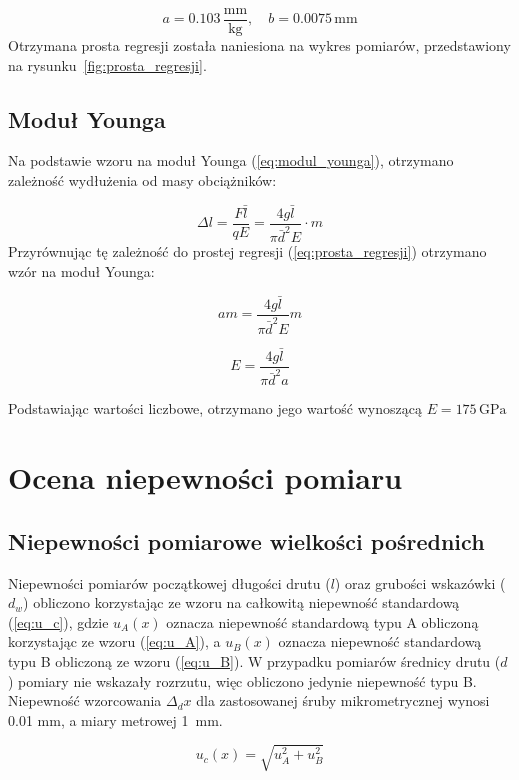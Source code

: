 \documentclass[a4paper,12pt]{article}
\begin{document}
\begin{equation}
a = 0.103\,\frac{\text{mm}}{\text{kg}}, \quad 
b = 0.0075\,\text{mm}
\end{equation}
Otrzymana prosta regresji została naniesiona na wykres pomiarów, przedstawiony na rysunku~\ref{fig:prosta_regresji}.

\subsection{Moduł Younga}

Na podstawie wzoru na moduł Younga (\ref{eq:modul_younga}), otrzymano zależność wydłużenia od masy obciążników:

\begin{equation}
\Delta l = \frac{F\bar{l}}{qE} = \frac{4g\bar{l}}{\pi\bar{d}^2 E}\cdot m
\end{equation}
Przyrównując tę zależność do prostej regresji (\ref{eq:prosta_regresji}) otrzymano wzór na moduł Younga:

$$
am = \frac{4g\bar{l}}{\pi\bar{d}^2 E}m
$$

$$
E = \frac{4g\bar{l}}{\pi\bar{d}^2 a}
$$

Podstawiając wartości liczbowe, otrzymano jego wartość wynoszącą $E = 175\,\text{GPa}$

\section{Ocena niepewności pomiaru}


\subsection{Niepewności pomiarowe wielkości pośrednich}

Niepewności pomiarów początkowej długości drutu ($l$) oraz  grubości wskazówki ($d_w$) obliczono korzystając ze wzoru na całkowitą niepewność standardową (\ref{eq:u_c}), gdzie $u_A(x)$ oznacza niepewność standardową typu A obliczoną korzystając ze wzoru (\ref{eq:u_A}), a $u_B(x)$ oznacza niepewność standardową typu B obliczoną ze wzoru (\ref{eq:u_B}).
W przypadku pomiarów średnicy drutu ($d$) pomiary nie wskazały rozrzutu, więc obliczono jedynie niepewność typu B.
Niepewność wzorcowania \( \Delta_d x \) dla zastosowanej śruby mikrometrycznej wynosi 0.01 mm, a miary metrowej 1~mm.

\begin{equation}
\label{eq:u_c}
u_c(x) = \sqrt{u_A^2 + u_B^2}
\end{equation}
\end{document}
